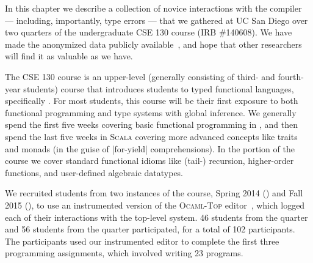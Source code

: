 In this chapter we describe a collection of novice interactions with the
\ocaml compiler --- including, importantly, type errors --- that we
gathered at UC San Diego over two quarters of the undergraduate CSE 130
course (IRB \#140608).
%
We have made the anonymized data publicly
available~\citep{Seidel2017-ko}, and hope that other researchers will
find it as valuable as we have.

The CSE 130 course is an upper-level (\ie generally consisting of third-
and fourth-year students) course that introduces students to typed
functional languages, specifically \ocaml.
%
For most students, this course will be their first exposure to both
functional programming and type systems with global inference.
%
We generally spend the first five weeks covering basic functional
programming in \ocaml, and then spend the last five weeks in
\textsc{Scala} covering more advanced concepts like traits and
monads (in the guise of |for-yield| comprehensions).
%
In the \ocaml portion of the course we cover standard functional idioms
like (tail-) recursion, higher-order functions, and user-defined
algebraic datatypes.

We recruited students from two instances of the course, Spring 2014
(\SPRING) and Fall 2015 (\FALL), to use an instrumented version of the
\textsc{Ocaml-Top} editor~, which logged each of their
interactions with the \ocaml top-level system.
%
46 students from the \SPRING quarter and 56 students from the \FALL
quarter participated, for a total of 102 participants.
%
The participants used our instrumented editor to complete the first
three programming assignments, which involved writing 23 \ocaml
programs.
%
